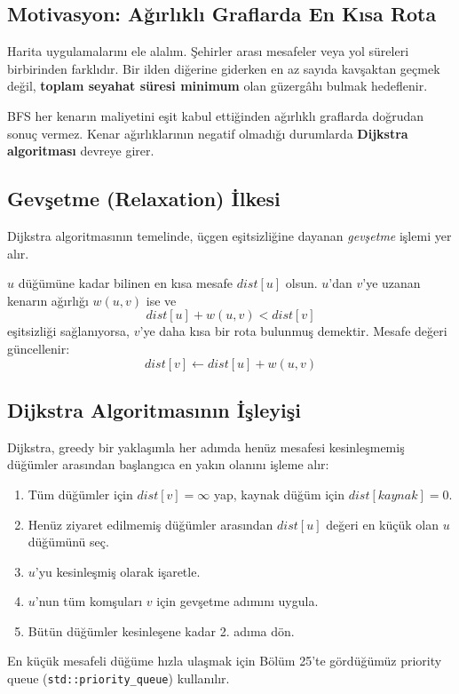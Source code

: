 \subsection{Motivasyon: Ağırlıklı Graflarda En Kısa Rota}
Harita uygulamalarını ele alalım. Şehirler arası mesafeler veya yol süreleri birbirinden farklıdır. Bir ilden diğerine giderken en az sayıda kavşaktan geçmek değil, \textbf{toplam seyahat süresi minimum} olan güzergâhı bulmak hedeflenir.

BFS her kenarın maliyetini eşit kabul ettiğinden ağırlıklı graflarda doğrudan sonuç vermez. Kenar ağırlıklarının negatif olmadığı durumlarda \textbf{Dijkstra algoritması} devreye girer.

\subsection{Gevşetme (Relaxation) İlkesi}
Dijkstra algoritmasının temelinde, üçgen eşitsizliğine dayanan \emph{gevşetme} işlemi yer alır.

$u$ düğümüne kadar bilinen en kısa mesafe $dist[u]$ olsun. $u$'dan $v$'ye uzanan kenarın ağırlığı $w(u, v)$ ise ve
\[
dist[u] + w(u, v) < dist[v]
\]
eşitsizliği sağlanıyorsa, $v$'ye daha kısa bir rota bulunmuş demektir. Mesafe değeri güncellenir:
\[
dist[v] \leftarrow dist[u] + w(u, v)
\]

\subsection{Dijkstra Algoritmasının İşleyişi}
Dijkstra, greedy bir yaklaşımla her adımda henüz mesafesi kesinleşmemiş düğümler arasından başlangıca en yakın olanını işleme alır:

\begin{enumerate}
    \item Tüm düğümler için $dist[v] = \infty$ yap, kaynak düğüm için $dist[kaynak] = 0$.
    \item Henüz ziyaret edilmemiş düğümler arasından $dist[u]$ değeri en küçük olan $u$ düğümünü seç.
    \item $u$'yu kesinleşmiş olarak işaretle.
    \item $u$'nun tüm komşuları $v$ için gevşetme adımını uygula.
    \item Bütün düğümler kesinleşene kadar 2. adıma dön.
\end{enumerate}

En küçük mesafeli düğüme hızla ulaşmak için Bölüm 25'te gördüğümüz priority queue (\texttt{std::priority\_queue}) kullanılır.

